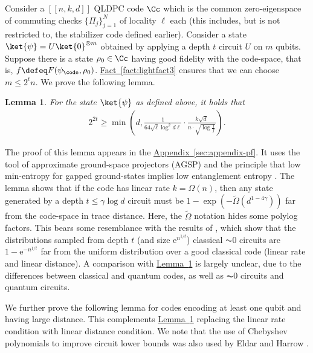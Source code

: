 \documentclass[11pt]{article}
\newcommand{\expref}[2]{\texorpdfstring{\hyperref[#2]{#1~\ref{#2}}}{#1~\ref{#2}}}
\newtheorem{lemma}[theorem]{Lemma}
\newcommand{\eee}{\mathrm e}
\begin{document}
Consider a $[[n, k,d]]$ QLDPC code $\Cc$ which is the common zero-eigenspace of commuting checks $\{\Pi_j\}_{j=1}^N$ of locality $\ell$ each (this includes, but is not restricted to, the stabilizer code defined earlier). Consider a state $\ket{\psi}=U\ket{0}^{\otimes m}$ obtained by applying a depth $t$ circuit $U$ on $m$ qubits. Suppose there is a state $\rho_0\in \Cc$ having good fidelity with the code-space, that is, $f \defeq F(\psi_{\code},\rho_0)$. \expref{Fact}{fact:lightfact3} ensures that we can choose $m\leq 2^tn$. We prove the following lemma.  
\begin{lemma}
\label{lem:rootdwarmup}
For the state $\ket{\psi}$ as defined above, it holds that
\begin{align}2^{2t}\geq \min\left(d, \frac{1}{64\sqrt{\ell}\log^2 d\ell}\cdot\frac{k\sqrt{d}}{ n  \cdot \sqrt{\log\frac{1}{f}}}\right).\end{align}
\end{lemma}
The proof of this lemma appears in the \expref{Appendix}{sec:appendix-pf}. It uses the tool of approximate ground-space projectors (AGSP) and the principle that low min-entropy for gapped ground-states implies low entanglement entropy \cite{hastings2007area_law, AradLV12, AradKLV13, AHS20}. The lemma shows that if the code has linear rate $k=\Omega(n)$, then any state generated by a depth $t \leq \gamma\log d$ circuit must be $1-\exp\left(-\widetilde{\Omega}\left(d^{1-4\gamma}\right)\right)$ far from the code-space in trace distance. Here, the $\tilde{\Omega}$ notation hides some polylog factors. This bears some resemblance with the results of \cite{BeckIL12, lovett-viola}, which show that the distributions sampled from depth $t$ (and size $\eee^{n^{1/t}}$) classical $\AC0$ circuits are $1-\eee^{-n^{1/t}}$ far from the uniform distribution over a good classical code (linear rate and linear distance). A comparison with \expref{Lemma}{lem:rootdwarmup} is largely unclear, due to the differences between classical and quantum codes, as well as $\AC0$ circuits and quantum circuits.  

We further prove the following lemma for codes encoding at least one qubit and having large distance. This complements \expref{Lemma}{lem:rootdwarmup} replacing the linear rate condition with linear distance condition. We note that the use of Chebyshev polynomials to improve circuit lower bounds was also used by Eldar and Harrow \cite[Propositions 44,45]{8104078}.
\end{document}
